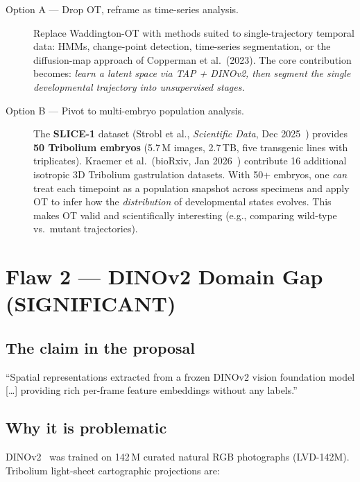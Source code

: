 \documentclass{article}
\begin{document}
\begin{description}
	\item[Option A --- Drop OT, reframe as time-series analysis.]
	      Replace Waddington-OT with methods suited to single-trajectory temporal
	      data: HMMs, change-point detection, time-series segmentation, or the
	      diffusion-map approach of Copperman et al.\ (2023). The core
	      contribution becomes: \emph{learn a latent space via TAP + DINOv2, then
		      segment the single developmental trajectory into unsupervised stages.}

	\item[Option B --- Pivot to multi-embryo population analysis.]
	      The \textbf{SLICE-1} dataset (Strobl et al., \textit{Scientific Data},
	      Dec 2025~\cite{slice1}) provides \textbf{50 Tribolium embryos} (5.7\,M
	      images, 2.7\,TB, five transgenic lines with triplicates). Kraemer et
	      al.\ (bioRxiv, Jan 2026~\cite{kraemer2026}) contribute 16 additional
	      isotropic 3D Tribolium gastrulation datasets. With 50+ embryos, one
	      \emph{can} treat each timepoint as a population snapshot across specimens
	      and apply OT to infer how the \emph{distribution} of developmental
	      states evolves. This makes OT valid and scientifically interesting
	      (e.g., comparing wild-type vs.\ mutant trajectories).
\end{description}

\section{Flaw 2 --- DINOv2 Domain Gap (SIGNIFICANT)}

\subsection*{The claim in the proposal}
``Spatial representations extracted from a frozen DINOv2 vision foundation
model [\ldots] providing rich per-frame feature embeddings without any labels.''

\subsection*{Why it is problematic}
DINOv2~\cite{dinov2} was trained on 142\,M curated natural RGB photographs
(LVD-142M). Tribolium light-sheet cartographic projections are:
\end{document}

